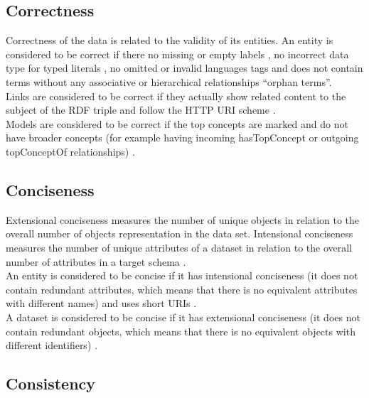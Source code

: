 \documentclass[onecolumn, crcready]{iosart2c}
\begin{document}
\subsection{Correctness}

Correctness of the data is related to the validity of its entities. An entity is considered to be correct if there no missing or empty labels \cite{Acosta2013}\cite{Mader2012}, no incorrect data type for typed literals \cite{Hogan2010}\cite{Acosta2013}, no omitted or invalid languages tags \cite{Suominen:2012:IQS:2413941.2413985}\cite{Mader2012} and does not contain terms without any associative or hierarchical relationships ``orphan terms''\cite{journals/ires/Living10}.\\ Links are considered to be correct if they actually show related content to the subject of the RDF triple \cite{Suominen:2012:IQS:2413941.2413985}\cite{Acosta2013} and follow the HTTP URI scheme \cite{Suominen2013}. \\ Models are considered to be correct if the top concepts are marked and do not have broader concepts (for example having incoming hasTopConcept or outgoing topConceptOf relationships) \cite{Mader2012}.

\subsection{Conciseness}

Extensional conciseness measures the number of unique objects in relation to the overall number of objects representation in the data set. Intensional conciseness measures the number of unique attributes of a dataset in relation to the overall number of attributes in a target schema \cite{ Bleiholder:2009}. \\ An entity is considered to be concise if it has intensional conciseness (it does not contain redundant attributes, which means that there is no equivalent attributes with different names) \cite{Mendes2012} and uses short URIs \cite{Framework2012}.\\ A dataset is considered to be concise if it has extensional conciseness (it does not contain redundant objects, which means that there is no equivalent objects with different identifiers) \cite{Mendes2012}.

\subsection{Consistency}
\end{document}
